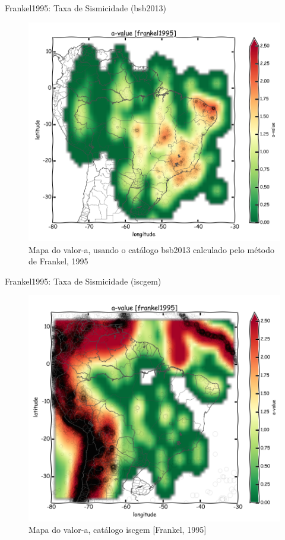 \documentclass[ucs,8pt]{beamer}
\begin{document}
\begin{frame}{Frankel1995: Taxa de Sismicidade (\gls{bsb2013})}
\begin{figure}[H]
  \centering
  \includegraphics[height=.95\textheight]{a_frankel_br} 
  \caption{Mapa do valor-a, usando o catálogo \gls{bsb2013} calculado pelo método de Frankel, 1995 }
  \label{fig:a_fran_br} 
\end{figure}
\end{frame}



\begin{frame}{Frankel1995: Taxa de Sismicidade (\gls{iscgem})}
\begin{figure}[H]
  \centering
  \includegraphics[height=.95\textheight]{a_frankel_sa} 
  \caption{Mapa do valor-a, catálogo \gls{iscgem} [Frankel, 1995] }
  \label{fig:a_fran_sa} 
\end{figure}
\end{frame}
\end{document}
